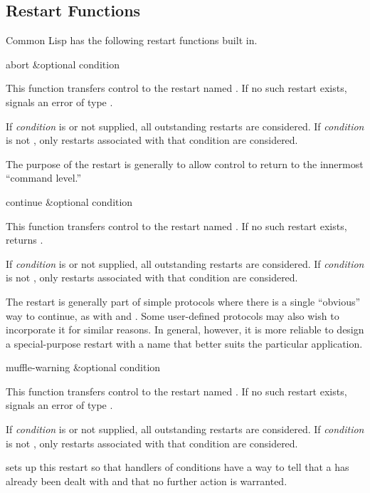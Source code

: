 \subsection{Restart Functions}

Common Lisp has the following restart functions built in.

\begin{defun}[Function]
abort &optional condition

  This function transfers control to the restart named . If no such
  restart exists,  signals an error of type .

 If \emph{condition} is  or not supplied, all outstanding restarts
are considered.
If \emph{condition} is not , only restarts associated
with that condition are considered.

  The purpose of the  restart is generally to allow control to return to the
  innermost ``command level.''
\end{defun}

\begin{defun}[Function]
continue &optional condition

  This function transfers control to the restart named . If no such
  restart exists,  returns .

 If \emph{condition} is  or not supplied, all outstanding restarts
are considered.
If \emph{condition} is not , only restarts associated
with that condition are considered.

  The  restart is generally part of simple protocols where there is
  a single ``obvious'' way to continue, as with  and . Some
  user-defined protocols may also wish to incorporate it for similar reasons.
  In general, however, it is more reliable to design a special-purpose restart
  with a name that better suits the particular application.
\end{defun}

\begin{defun}[Function]
muffle-warning &optional condition

  This function transfers control to the restart named .
  If no such restart exists,  signals an error of type 
  .
 
 If \emph{condition} is  or not supplied, all outstanding restarts
are considered.
If \emph{condition} is not , only restarts associated
with that condition are considered.

   sets up this restart so that handlers of  conditions have
  a way to tell  that a  has already been dealt with and
  that no further action is warranted.
\end{defun}


